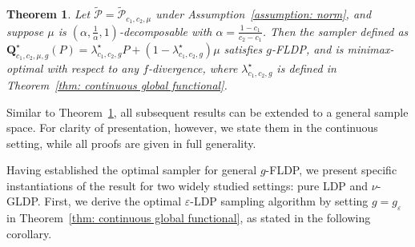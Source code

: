 \documentclass[accepted]{article}
\theoremstyle{plain} %
\newtheorem{theorem}{Theorem}[section]
\theoremstyle{definition}
\theoremstyle{remark}
\newcommand{\eps}{\varepsilon}
\newcommand{\bQ}{\mathbf{Q}}
\newcommand{\SA}[1]{\textbf{\textcolor{Magenta}{[#1]}}}
\newcommand{\HG}[1]{\textcolor{cyan}{[#1]}}
\begin{document}
\begin{theorem}\label{thm: global functional}
Let \( \tilde{\mathcal{P}} = \tilde{\mathcal{P}}_{c_1, c_2, \mu} \) under Assumption~\ref{assumption: norm}, and suppose \( \mu \) is \( (\alpha, \frac{1}{\alpha}, 1) \)-decomposable with \( \alpha = \frac{1 - c_1}{c_2 - c_1} \). Then the sampler defined as \( \bQ^\star_{c_1,c_2,\mu,g}(P) = \lambda^\star_{c_1,c_2,g} P + (1 - \lambda^\star_{c_1,c_2,g}) \mu \) satisfies $g$-FLDP, and is minimax-optimal with respect to any $f$-divergence, where $\lambda_{c_1,c_2,g}^\star$ is defined in Theorem~\ref{thm: continuous global functional}.

\end{theorem}


Similar to Theorem~\ref{thm: global functional}, all subsequent results can be extended to a general sample space. For clarity of presentation, however, we state them in the continuous setting, while all proofs are given in full generality. 






Having established the optimal sampler for general \( g \)-FLDP, we present specific instantiations of the result for two widely studied settings: pure LDP and $\nu$-GLDP. First, we derive the optimal $\eps$-LDP sampling algorithm by setting $g=g_\eps$ in Theorem~\ref{thm: continuous global functional}, as stated in the following corollary.
\end{document}
